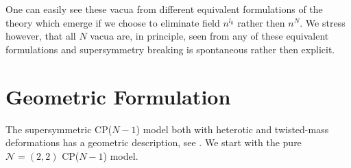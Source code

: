 \documentclass[12pt]{article}
\newcommand{\ntwot}{${\mathcal N}= \left(2,2\right) $ }
\begin{document}
One can easily see these vacua from different equivalent formulations of the theory which emerge if  we choose to eliminate
field $n^{l_0}$ rather then $n^N$. We stress however, that
all $N$ vacua are, in principle, seen from any of these
equivalent formulations and supersymmetry breaking is spontaneous
rather then explicit.



%
%
\section{Geometric Formulation}
\label{geomf}	
	
	The supersymmetric CP($N-1$) model both with heterotic and twisted-mass deformations has
	a geometric description, see \cite{SVZw,SYhet}.
	We start with the pure \ntwot CP($N-1$) model.
\end{document}
